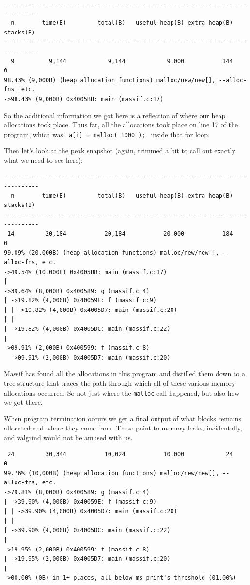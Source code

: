 \documentclass[a4paper]{report}
\begin{document}
{
\begin{verbatim}
--------------------------------------------------------------------------------
  n        time(B)         total(B)   useful-heap(B) extra-heap(B)    stacks(B)
--------------------------------------------------------------------------------
  9          9,144            9,144            9,000           144            0
98.43% (9,000B) (heap allocation functions) malloc/new/new[], --alloc-fns, etc.
->98.43% (9,000B) 0x4005BB: main (massif.c:17)
\end{verbatim}
}

So the additional information we got here is a reflection of where our heap allocations took place. Thus far, all the allocations took place on line 17 of the program, which was \texttt{  a[i] = malloc( 1000 ); } inside that for loop.

Then let's look at the peak snapshot (again, trimmed a bit to call out exactly what we need to see here):

{
\begin{verbatim}
--------------------------------------------------------------------------------
  n        time(B)         total(B)   useful-heap(B) extra-heap(B)    stacks(B)
--------------------------------------------------------------------------------
 14         20,184           20,184           20,000           184            0
99.09% (20,000B) (heap allocation functions) malloc/new/new[], --alloc-fns, etc.
->49.54% (10,000B) 0x4005BB: main (massif.c:17)
| 
->39.64% (8,000B) 0x400589: g (massif.c:4)
| ->19.82% (4,000B) 0x40059E: f (massif.c:9)
| | ->19.82% (4,000B) 0x4005D7: main (massif.c:20)
| |   
| ->19.82% (4,000B) 0x4005DC: main (massif.c:22)
|   
->09.91% (2,000B) 0x400599: f (massif.c:8)
  ->09.91% (2,000B) 0x4005D7: main (massif.c:20)

\end{verbatim}
}

Massif has found all the allocations in this program and distilled them down to a tree structure that traces the path through which all of these various memory allocations occurred. So not just where the \texttt{malloc} call happened, but also how we got there.

When program termination occurs we get a final output of what blocks remains allocated and where they come from. These point to memory leaks, incidentally, and valgrind would not be amused with us.

{
\begin{verbatim}
 24         30,344           10,024           10,000            24            0
99.76% (10,000B) (heap allocation functions) malloc/new/new[], --alloc-fns, etc.
->79.81% (8,000B) 0x400589: g (massif.c:4)
| ->39.90% (4,000B) 0x40059E: f (massif.c:9)
| | ->39.90% (4,000B) 0x4005D7: main (massif.c:20)
| |   
| ->39.90% (4,000B) 0x4005DC: main (massif.c:22)
|   
->19.95% (2,000B) 0x400599: f (massif.c:8)
| ->19.95% (2,000B) 0x4005D7: main (massif.c:20)
|   
->00.00% (0B) in 1+ places, all below ms_print's threshold (01.00%)
\end{verbatim}
}
\end{document}
